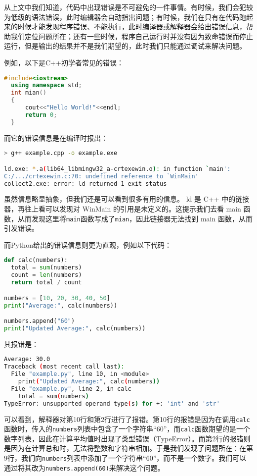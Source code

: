 从上文中我们知道，代码中出现错误是不可避免的一件事情。有时候，我们会犯较为低级的语法错误，此时编辑器会自动指出问题；有时候，我们在只有在代码跑起来的时候才能发现程序错误、不能执行，此时编译器或解释器会给出错误信息，帮助我们定位问题所在；还有一些时候，程序自己运行时并没有因为致命错误而停止运行，但是输出的结果并不是我们期望的，此时我们只能通过调试来解决问题。

例如，以下是C++初学者常见的错误：

\begin{lstlisting}[language=C++]
  #include<iostream>
  using namespace std;
  int mian()
  {
      cout<<"Hello World!"<<endl;
      return 0;
  }
\end{lstlisting}

而它的错误信息是在编译时报出：

\begin{lstlisting}[language=bash]
> g++ example.cpp -o example.exe

ld.exe: *.a(lib64_libmingw32_a-crtexewin.o): in function `main':
C:/.../crtexewin.c:70: undefined reference to `WinMain'
collect2.exe: error: ld returned 1 exit status
\end{lstlisting}

虽然信息略显抽象，但我们还是可以看到很多有用的信息。 ld 是 C++ 中的链接器，再往上看可以发现对 WinMain 的引用是未定义的。这提示我们去看 main 函数，从而发现这里将\texttt{main}函数写成了\texttt{mian}，因此链接器无法找到 main 函数，从而引发错误。

而Python给出的错误信息则更为直观，例如以下代码：

\begin{lstlisting}[language=Python]
def calc(numbers):
  total = sum(numbers)
  count = len(numbers)
  return total / count

numbers = [10, 20, 30, 40, 50]
print("Average:", calc(numbers))

numbers.append("60")
print("Updated Average:", calc(numbers))
\end{lstlisting}

其报错是：
\begin{lstlisting}[language=bash]
Average: 30.0
Traceback (most recent call last):
  File "example.py", line 10, in <module>
    print("Updated Average:", calc(numbers))
  File "example.py", line 2, in calc
    total = sum(numbers)
TypeError: unsupported operand type(s) for +: 'int' and 'str'
\end{lstlisting}

可以看到，解释器对第10行和第2行进行了报错。第10行的报错是因为在调用\texttt{calc}函数时，传入的\texttt{numbers}列表中包含了一个字符串“60”，而\texttt{calc}函数期望的是一个数字列表，因此在计算平均值时出现了类型错误（TypeError）。而第2行的报错则是因为在计算总和时，无法将整数和字符串相加。于是我们发现了问题所在：在第9行，我们向\texttt{numbers}列表中添加了一个字符串“60”，而不是一个数字。我们可以通过将其改为\texttt{numbers.append(60)}来解决这个问题。

